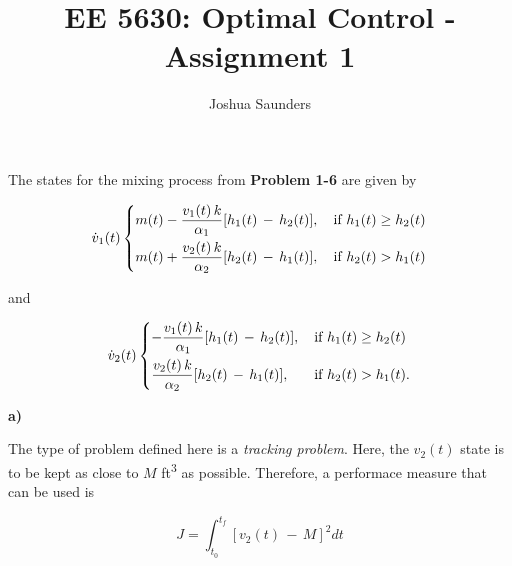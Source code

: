 \documentclass[12pt]{article}
\newenvironment{problem}[2][Problem]{\begin{trivlist}
\item[\hskip \labelsep {\bfseries #1}\hskip \labelsep {\bfseries #2.}]}{\end{trivlist}}
\newcommand\ddfrac[2]{\frac{\displaystyle #1}{\displaystyle #2}}
\begin{document}
 
 
\title{EE 5630: Optimal Control - Assignment 1}%
\author{Joshua Saunders\\ %
} %
 
\maketitle
 
\begin{problem}{2-1} %
\end{problem}
 
The states for the mixing process from \textbf{Problem 1-6} are given by

\begin{equation}
\dot{v}_1 (t) 
\begin{dcases}
    m(t) - \ddfrac{v_1(t) \, k}{\alpha _1 }[h_1(t) \, - \, h_2(t)],  \, & \text{if } h_1(t) \geq h_2(t) \\
    m(t) + \ddfrac{v_2(t) \, k}{\alpha _2 }[h_2(t) \, - \, h_1(t)],  \, & \text{if } h_2(t) > h_1(t) 
\end{dcases}
\end{equation}

and

\begin{equation}
\dot{v}_2 (t) 
\begin{dcases}
    - \ddfrac{v_1(t) \, k}{\alpha _1 }[h_1(t) \, - \, h_2(t)],  \, & \text{if } h_1(t) \geq h_2(t) \\ 
      \ddfrac{v_2(t) \, k}{\alpha _2 }[h_2(t) \, - \, h_1(t)],  \, & \text{if } h_2(t) > h_1(t). 
\end{dcases}
\end{equation}

\noindent \textbf{a)} \newline

The type of problem defined here is a \textit{tracking problem}. Here, the $v_2 (t)$ state is to be kept
as close to $M$ ft\textsuperscript{3} as possible. Therefore, a performace measure that can be used is

\begin{equation}
    J = \int_{t_0}^{t_f} [v_2 (t) \, - \, M]^2 dt
\end{equation}
\end{document}
